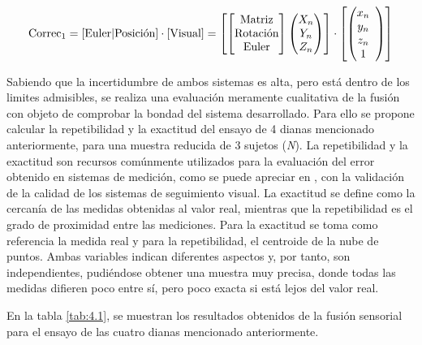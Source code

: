 \begin{equation}\label{eq:7}
\text{Correc}_1 = \left[ \text{Euler} | \text{Posición} \right] \cdot \left[ \text{Visual} \right] = \left[ \left[ \begin{array}{@{}c@{}}
\text{Matriz} \\
\text{Rotación} \\ 
\text{Euler} \\
\end{array} \right] \left( \begin{array}{@{}c@{}}
X_n \\
Y_n \\
Z_n \\
\end{array} \right) \right] \cdot \left[ \left( \begin{array}{@{}ccc@{}}
x_n \\
y_n \\
z_n \\
1  \\
\end{array} \right) \right]
\end{equation}

Sabiendo que la incertidumbre de ambos sistemas es alta, pero está dentro de los limites admisibles, se realiza una evaluación meramente cualitativa de la fusión con objeto de comprobar la bondad del sistema desarrollado. Para ello se propone calcular la repetibilidad y la exactitud del ensayo de 4 dianas mencionado anteriormente, para una muestra reducida de 3 sujetos (\emph{N}). La repetibilidad y la exactitud son recursos comúnmente utilizados para la evaluación del error obtenido en sistemas de medición, como se puede apreciar en \textcite{holmqvist}, con la validación de la calidad de los sistemas de seguimiento visual. La exactitud se define como la cercanía de las medidas obtenidas al valor real, mientras que la repetibilidad es el grado de proximidad entre las mediciones. Para la exactitud se toma como referencia la medida real y para la repetibilidad, el centroide de la nube de puntos. Ambas variables indican diferentes aspectos y, por tanto, son independientes, pudiéndose obtener una muestra muy precisa, donde todas las medidas difieren poco entre sí, pero poco exacta si está lejos del valor real.

En la tabla \ref{tab:4.1}, se muestran los resultados obtenidos de la fusión sensorial para el ensayo de las cuatro dianas mencionado anteriormente.

